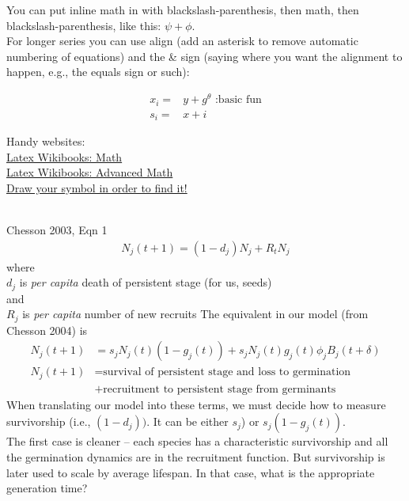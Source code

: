 \documentclass[11pt,a4paper,oneside]{article}
\begin{document}
You can put inline math in with blackslash-parenthesis, then math, then blackslash-parenthesis, like this: \(\psi+\phi\).\\

For longer series you can use align (add an asterisk to remove automatic numbering of equations) and the \& sign (saying where you want the alignment to happen, e.g., the equals sign or such):

\begin{align}
x_{i} =& y+g^{\theta} \text{   :basic fun} 
\\
s_{i} =& x+i
\end{align}

\noindent Handy websites:\\
\href {http://en.wikibooks.org/wiki/LaTeX/Mathematics}{Latex Wikibooks: Math}\\
\href{http://en.wikibooks.org/wiki/LaTeX/Advanced_Mathematics}{Latex Wikibooks: Advanced Math}\\
\href{http://detexify.kirelabs.org/classify.html}{Draw your symbol in order to find it!}

\\
\noindent Chesson 2003, Eqn 1
\begin{align}
N_{j}(t+1) = (1-d_{j}) N_{j} + R_{t}N_{j} 
\end{align}
where 
\\$d_{j}$ is \emph{per capita} death of persistent stage (for us, seeds) %
\\and
\\$R_{j}$ is \emph{per capita} number of new recruits
The equivalent in our model (from Chesson 2004) is 
\begin{align*} %
N_{j}(t+1) & = s_{j}N_{j}(t)(1-g_{j}(t)) + s_{j}N_{j}(t)g_{j}(t)\phi_{j}B_{j}(t+\delta)\\
N_{j}(t+1) & = \text{survival of persistent stage and loss to germination} \\
& + \text{recruitment to persistent stage from germinants}
\end{align*}
When translating our model into these terms, we must decide how to measure survivorship (i.e., \((1-d_{j}))\).  It can be either \(s_{j}\)) or \(s_{j}(1-g_{j}(t))\). 
\\The first case is cleaner -- each species has a characteristic survivorship and all the germination dynamics are in the recruitment function.  But survivorship is later used to scale by average lifespan.  In that case, what is the appropriate generation time?  
\end{document}
